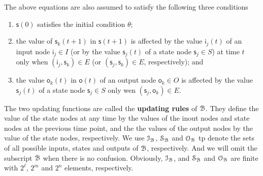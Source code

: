 \begin{definition}
\begin{itemize}
\begin{equation}
\label{equ:1}
\end{equation}
The above equations are also assumed to satisfy the following three conditions
\begin{enumerate}
\item $\mathsf{s}(0)$ satisfies the initial condition $\theta$;
\item the value of $\mathsf{s}_k(t+1)$ in $\mathsf{s}(t+1)$ is affected by the value  $\mathsf{i}_j(t)$ of an input node $\mathsf{i}_j \in I$ (or by the value $\mathsf{s}_j(t)$ of a state node $\mathsf{s}_j\in S$) at time $t$ only when $(\mathsf{i}_j, \mathsf{s}_k)\in E$ (or $(\mathsf{s}_j, \mathsf{s}_k)\in E$, respectively); and
\item the value $\mathsf{o}_k(t)$ in $\mathsf{o}(t)$ of an output node $\mathsf{o}_k\in O$ is affected by the value $\mathsf{s}_j(t)$ of a state node $\mathsf{s}_j\in S$ only wen $(\mathsf{s}_j,\mathsf{o}_k)\in E$.
\end{enumerate}
\end{itemize}

\end{definition}
 The two updating functions are called the  {\bf updating rules}  of ${\mathcal{B}}$. They define the value of the state nodes at any time by the values of the inout nodes and state nodes at the previous time point, and the the values of the output nodes by the value of the state nodes, respectively. We use $\mathcal{I}_{\mathcal{B}}$, $\mathcal{S}_{\mathcal{B}}$ and $\mathcal{O}_{\mathcal{B}}$ tp denote  the sets of all possible inputs, states and outputs of ${\mathcal{B}}$, respectively. And we will omit the subscript ${\mathcal{B}}$ when there is no confusion. Obviously, $\mathcal{I}_{\mathcal{B}}$, and $\mathcal{S}_{\mathcal{B}}$ and $\mathcal{O}_{\mathcal{B}}$ are finite with $2^\ell$, $2^m$ and $2^n$ elements, respectively. 


